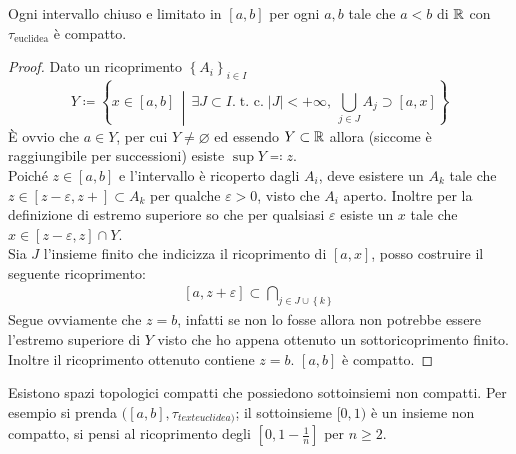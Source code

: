 \begin{theorem}
	Ogni intervallo chiuso e limitato in $\left[a, b\right]$ per ogni $a, b$ tale che $a < b$ di $\mathbb{R}$ con $\tau_{\text{euclidea}}$ è compatto.
\end{theorem} 
\begin{proof}
	Dato un ricoprimento $\left\{A_i\right\}_{i \in I}$ 
	\begin{equation*}
			Y \coloneqq \left\{ x\in \left[a,b\right] \,\middle|\, \exists J \subset I. \; \text{t. c.} \; |J| < +\infty,\ \bigcup_{j \in J} A_j \supset \left[a,x\right] \right\}
	\end{equation*}
	È ovvio che $a \in Y$, per cui $Y \neq \varnothing$ ed essendo $Y \subset \mathbb{R}$ allora (siccome è raggiungibile per successioni) esiste $\sup Y \eqqcolon z$. \\ Poiché $z \in \left[a,b\right]$ e l'intervallo è ricoperto dagli $A_i$, deve esistere un $A_{k}$ tale che $z \in [z-\varepsilon, z+] \subset A_k$ per qualche $\varepsilon > 0$, visto che $A_i$ aperto. Inoltre per la definizione di estremo superiore so che per qualsiasi $\varepsilon$ esiste un $x$ tale che $x \in \left[z-\varepsilon, z\right] \cap Y$. \\ Sia $J$ l'insieme finito che indicizza il ricoprimento di $[a,x]$, posso costruire il seguente ricoprimento:
	\begin{align*}
		\left[a,z+\varepsilon\right] \subset \bigcap_{j \in J\cup \left\{k\right\}}
	\end{align*}
Segue ovviamente che $z = b$, infatti se non lo fosse allora non potrebbe essere l'estremo superiore di $Y$ visto che ho appena ottenuto un sottoricoprimento finito. Inoltre il ricoprimento ottenuto contiene $z = b$. $\left[a,b\right]$ è compatto.
\end{proof}

\begin{remark}
	Esistono spazi topologici compatti che possiedono sottoinsiemi non compatti. Per esempio si prenda $(\left[a, b\right],\tau_{text{euclidea})}$; il sottoinsieme $[0, 1)$ è un insieme non compatto, si pensi al ricoprimento degli $[0,1-\frac{1}{n}]$ per $n \geq 2$.
\end{remark} 

